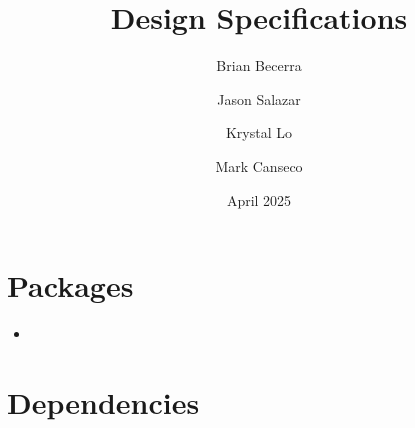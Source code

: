 \documentclass[12pt]{article}
\title{Design Specifications}
\author{
    Brian Becerra\\
    \and
    Jason Salazar\\
    \and
    Krystal Lo\\
    \and
    Mark Canseco\\
    }
\date{April 2025}
\begin{document}
\begin{titlepage}
\maketitle
\thispagestyle{empty}
\end{titlepage}

\section*{Packages}
\begin{itemize}
    \item 
\end{itemize}

\section*{Dependencies}
\end{document}
